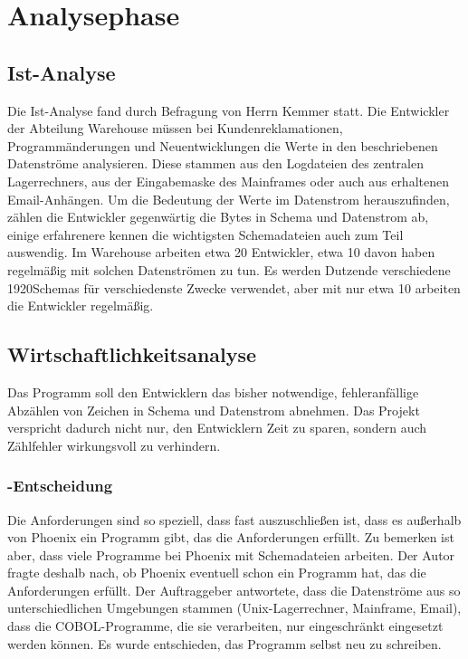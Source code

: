 \section{Analysephase} 
\label{sec:Analysephase}

\subsection{Ist-Analyse} 
\label{sec:IstAnalyse}
Die Ist-Analyse fand durch Befragung von Herrn Kemmer statt. 
Die Entwickler der Abteilung Warehouse müssen bei Kundenreklamationen, Programmänderungen und Neuentwicklungen die Werte in den beschriebenen Datenströme analysieren. Diese stammen aus den Logdateien des zentralen Lagerrechners, aus der Eingabemaske des Mainframes oder auch aus erhaltenen Email-Anhängen. Um die Bedeutung der Werte im Datenstrom herauszufinden, zählen die Entwickler gegenwärtig die Bytes in Schema und Datenstrom ab, einige erfahrenere kennen die wichtigsten Schemadateien auch zum Teil auswendig.
Im Warehouse arbeiten etwa 20 Entwickler, etwa 10 davon haben regelmäßig mit solchen Datenströmen zu tun. Es werden Dutzende verschiedene 1920Schemas für verschiedenste Zwecke verwendet, aber mit nur etwa 10 arbeiten die Entwickler regelmäßig.


\subsection{Wirtschaftlichkeitsanalyse}
\label{sec:Wirtschaftlichkeitsanalyse}
Das Programm soll den Entwicklern das bisher notwendige, fehleranfällige Abzählen von Zeichen in Schema und Datenstrom abnehmen. Das Projekt verspricht dadurch nicht nur, den Entwicklern Zeit zu sparen, sondern auch Zählfehler wirkungsvoll zu verhindern.

\subsubsection{-Entscheidung}
\label{sec:MakeOrBuyEntscheidung}
Die Anforderungen sind so speziell, dass fast auszuschließen ist, dass es außerhalb von Phoenix ein Programm gibt, das die Anforderungen erfüllt. Zu bemerken ist aber, dass viele Programme bei Phoenix mit Schemadateien arbeiten. Der Autor fragte deshalb nach, ob Phoenix eventuell schon ein Programm hat, das die Anforderungen erfüllt. Der Auftraggeber antwortete, dass die Datenströme aus so unterschiedlichen Umgebungen stammen (Unix-Lagerrechner, Mainframe, Email), dass die COBOL-Programme, die sie verarbeiten, nur eingeschränkt eingesetzt werden können. Es wurde entschieden, das Programm selbst neu zu schreiben.

